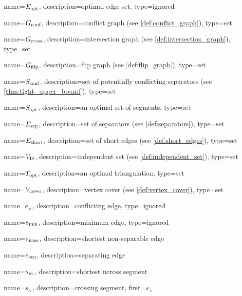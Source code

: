 {
  name={\ensuremath{E_\textnormal{opt}}},
  description={optimal edge set},
  type={ignored}
}

{
  name={\ensuremath{G_\textnormal{conf}}},
  description={conflict graph (see \cref{def:conflict_graph})},
  type={set}
}

{
  name={\ensuremath{G_\textnormal{cross}}},
  description={intersection graph (see \cref{def:intersection_graph})},
  type={set}
}

{
  name={\ensuremath{G_\textnormal{flip}}},
  description={flip graph (see \cref{def:flip_graph})},
  type={set}
}

{
  name={\ensuremath{S_\textnormal{conf}}},
  description={set of potentially conflicting separators (see \cref{thm:tight_upper_bound})},
  type={set}
}

{
  name={\ensuremath{S_\textnormal{opt}}},
  description={an optimal set of segments},
  type={set}
}

{
  name={\ensuremath{E_\textnormal{sep}}},
  description={set of separators (see \cref{def:separators})},
  type={set}
}

{
  name={\ensuremath{E_\textnormal{short}}},
  description={set of short edges (see \cref{def:short_edges})},
  type={set}
}

{
  name={\ensuremath{V_\textnormal{IS}}},
  description={independent set (see \cref{def:independent_set})},
  type={set}
}

{
  name={\ensuremath{T_\textnormal{opt}}},
  description={an optimal triangulation},
  type={set}
}

{
  name={\ensuremath{V_\textnormal{cover}}},
  description={vertex cover (see \cref{def:vertex_cover})},
  type={set}
}

{
  name={\ensuremath{e_{\times}}},
  description={conflicting edge},
  type={ignored}
}

{
  name={\ensuremath{e_\textnormal{min}}},
  description={minimum edge},
  type={ignored}
}

{
  name={\ensuremath{e_\textnormal{nose}}},
  description={shortest non-separable edge}
}

{
  name={\ensuremath{e_\textnormal{sep}}},
  description={separating edge}
}

{
  name={\ensuremath{s_\textnormal{nc}}},
  description={shortest \gls{ncross} segment}
}

{
  name={\ensuremath{s_{\times}}},
  description={crossing segment},
  first={\ensuremath{s_{\times}}}
}
